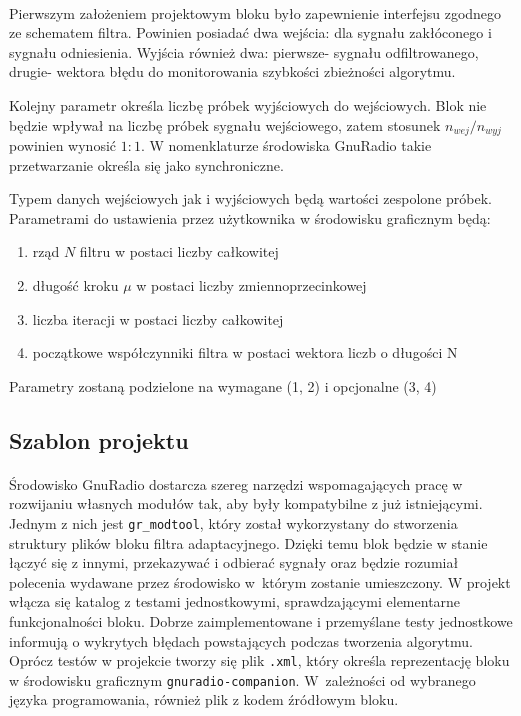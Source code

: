 \paragraph{}
Pierwszym założeniem projektowym bloku było zapewnienie interfejsu zgodnego ze schematem filtra. 
Powinien posiadać dwa wejścia: dla sygnału zakłóconego i sygnału odniesienia. 
Wyjścia również dwa: pierwsze- sygnału odfiltrowanego, drugie- wektora błędu do monitorowania szybkości zbieżności algorytmu.

Kolejny parametr określa liczbę próbek wyjściowych do wejściowych.
Blok nie będzie wpływał na liczbę próbek sygnału wejściowego, zatem stosunek $n_{wej}/n_{wyj}$ powinien wynosić $1:1$. 
W nomenklaturze środowiska GnuRadio takie przetwarzanie określa się jako synchroniczne.

Typem danych wejściowych jak i wyjściowych będą wartości zespolone próbek.
Parametrami do ustawienia przez użytkownika w środowisku graficznym będą:
\begin{enumerate}
 \item rząd $N$ filtru w postaci liczby całkowitej 
 \item długość kroku $\mu$ w postaci liczby zmiennoprzecinkowej
 \item liczba iteracji w postaci liczby całkowitej
 \item początkowe współczynniki filtra w postaci wektora liczb o długości N 
 \end{enumerate}
 
Parametry zostaną podzielone na wymagane (1, 2) i opcjonalne (3, 4)
\subsection{Szablon projektu}
\paragraph{}
Środowisko GnuRadio dostarcza szereg narzędzi wspomagających pracę w rozwijaniu własnych modułów tak, aby były kompatybilne z już istniejącymi. 
Jednym z nich jest \texttt{gr\_modtool}, który został wykorzystany do stworzenia struktury plików bloku filtra adaptacyjnego. 
Dzięki temu blok będzie w stanie łączyć się z innymi, przekazywać i odbierać sygnały oraz będzie rozumiał polecenia wydawane przez środowisko w~którym zostanie umieszczony. 
W projekt włącza się katalog z testami jednostkowymi, sprawdzającymi elementarne funkcjonalności bloku. 
Dobrze zaimplementowane i przemyślane testy jednostkowe informują o wykrytych błędach powstających podczas tworzenia algorytmu.
Oprócz testów w projekcie tworzy się plik \texttt{.xml}, który określa reprezentację bloku w środowisku graficznym \texttt{gnuradio-companion}. 
W~zależności od wybranego języka programowania, również plik z kodem źródłowym bloku.
